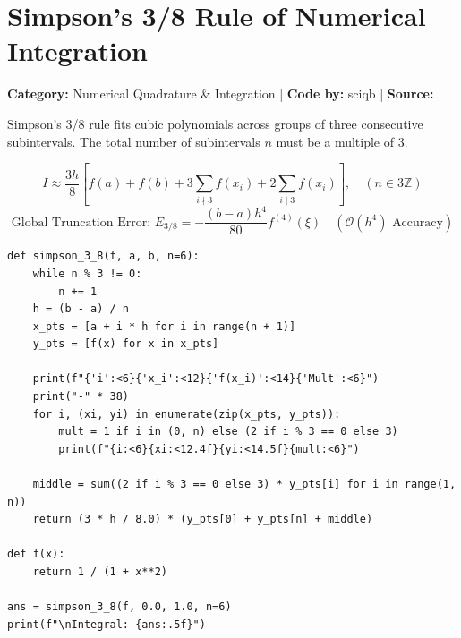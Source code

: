\documentclass[10pt,a4paper]{report}
\begin{document}
\newpage


\section{Simpson's 3/8 Rule of Numerical Integration}
\textbf{Category:} \textcolor{secondary}{Numerical Quadrature \& Integration} \quad | \quad \textbf{Code by:} \textcolor{secondary}{sciqb} \quad | \quad \textbf{Source:} \texttt{}

Simpson's 3/8 rule fits cubic polynomials across groups of three consecutive subintervals. The total number of subintervals $n$ must be a multiple of 3.

\begin{tcolorbox}[colback=theorybg,colframe=theoryframe,title=\textbf{Mathematical Theory \& Formulation},boxrule=1pt,arc=2mm]
\[
I \approx \frac{3h}{8}\left[f(a) + f(b) + 3 \sum_{i \nmid 3} f(x_i) + 2 \sum_{i \mid 3} f(x_i)\right], \quad (n \in 3\mathbb{Z})
\]
\[
\text{Global Truncation Error: } E_{3/8} = -\frac{(b - a) h^4}{80} f^{(4)}(\xi) \quad (\mathcal{O}(h^4) \text{ Accuracy})
\]
\end{tcolorbox}

\begin{tcolorbox}[colback=codebg,colframe=secondary,title=\textbf{Python Implementation (Step-by-Step Functions)},boxrule=1pt,arc=2mm]
\begin{lstlisting}[style=python_detailed]
def simpson_3_8(f, a, b, n=6):
    while n % 3 != 0:
        n += 1
    h = (b - a) / n
    x_pts = [a + i * h for i in range(n + 1)]
    y_pts = [f(x) for x in x_pts]

    print(f"{'i':<6}{'x_i':<12}{'f(x_i)':<14}{'Mult':<6}")
    print("-" * 38)
    for i, (xi, yi) in enumerate(zip(x_pts, y_pts)):
        mult = 1 if i in (0, n) else (2 if i % 3 == 0 else 3)
        print(f"{i:<6}{xi:<12.4f}{yi:<14.5f}{mult:<6}")

    middle = sum((2 if i % 3 == 0 else 3) * y_pts[i] for i in range(1, n))
    return (3 * h / 8.0) * (y_pts[0] + y_pts[n] + middle)

def f(x):
    return 1 / (1 + x**2)

ans = simpson_3_8(f, 0.0, 1.0, n=6)
print(f"\nIntegral: {ans:.5f}")


\end{lstlisting}
\end{tcolorbox}
\end{document}
